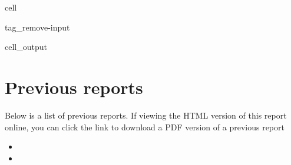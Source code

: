 \documentclass[letterpaper,10pt,english]{jupyterBook}
\begin{document}
\begin{sphinxuseclass}{cell}
\begin{sphinxuseclass}{tag_remove-input}
\begin{sphinxVerbatimOutput}
\begin{sphinxuseclass}{cell_output}
\end{sphinxuseclass}\end{sphinxVerbatimOutput}

\end{sphinxuseclass}
\end{sphinxuseclass}
\sphinxstepscope


\chapter{Previous reports}
\label{\detokenize{previous_reports:previous-reports}}\label{\detokenize{previous_reports::doc}}
\sphinxAtStartPar
Below is a list of previous reports. If viewing the HTML version of this report online, you can click the link to download a PDF version of a previous report
\begin{itemize}
\item {} 
\sphinxAtStartPar
{}

\item {} 
\sphinxAtStartPar
{}

\end{itemize}







\renewcommand{\indexname}{Index}
\printindex
\end{document}
